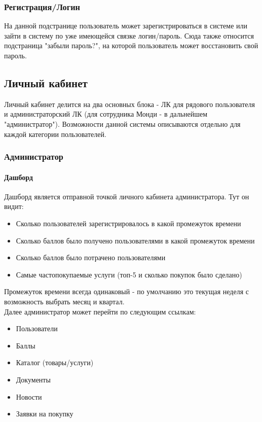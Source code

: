 \documentclass[DIV=calc, paper=a4, fontsize=11pt]{scrartcl} %
\begin{document}
\subsubsection{Регистрация/Логин}
На данной подстранице пользователь может зарегистрироваться в системе или зайти в систему по уже имеющейся связке логин/пароль. Сюда также относится подстраница "забыли пароль?", на которой пользователь может восстановить свой пароль.

\subsection{Личный кабинет}

Личный кабинет делится на два основных блока - ЛК для рядового пользователя и администраторский ЛК (для сотрудника Монди - в дальнейшем "администратор"). Возможности данной системы описываются отдельно для каждой категории пользователей.

\subsubsection{Администратор}

\paragraph{Дашборд}

Дашборд является отправной точкой личного кабинета администратора. Тут он видит:

\begin{itemize}
	\item Сколько пользователей зарегистрировалось в какой промежуток времени
	\item Сколько баллов было получено пользователями в какой промежуток времени
	\item Сколько баллов было потрачено пользователями
	\item Самые частопокупаемые услуги (топ-5 и сколько покупок было сделано)
\end{itemize}

Промежуток времени всегда одинаковый - по умолчанию это текущая неделя с возможность выбрать месяц и квартал.
\\[0.5cm]
Далее администратор может перейти по следующим ссылкам:

\begin{itemize}
	\item Пользователи
	\item Баллы
	\item Каталог (товары/услуги)
	\item Документы
	\item Новости
	\item Заявки на покупку
\end{itemize}
\end{document}
